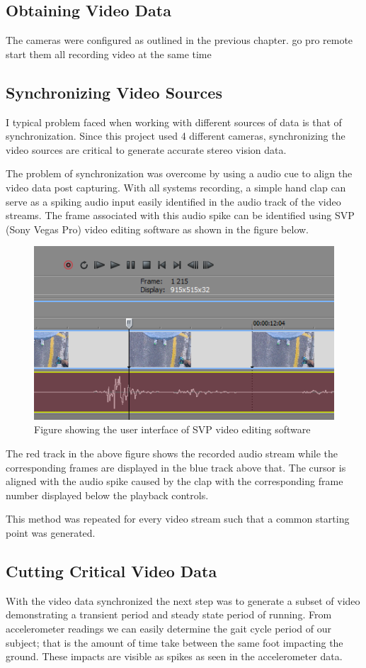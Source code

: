 \subsection{Obtaining Video Data}
The cameras were configured as outlined in the previous chapter. go pro remote start them all recording video at the same time



\subsection{Synchronizing Video Sources}
I typical problem faced when working with different sources of data is that of synchronization. Since this project used 4 different cameras, synchronizing the video sources are critical to generate accurate stereo vision data.

The problem of synchronization was overcome by using a audio cue to align the video data post capturing. With all systems recording, a simple hand clap can serve as a spiking audio input easily identified in the audio track of the video streams. The frame associated with this audio spike can be identified using SVP (Sony Vegas Pro) video editing software as shown in the figure below. 

\begin{figure}[!ht]
\captionsetup{width=0.8\linewidth, font=small} 
\includegraphics[width=0.5\linewidth]{figures/svpframe.png}
\caption{Figure showing the user interface of SVP video editing software}
\label{fig:svpframe}
\end{figure}

The red track in the above figure shows the recorded audio stream while the corresponding frames are displayed in the blue track above that. The cursor is aligned with the audio spike caused by the clap with the corresponding frame number displayed below the playback controls.

This method was repeated for every video stream such that a common starting point was generated. 

\subsection{Cutting Critical Video Data}
With the video data synchronized the next step was to generate a subset of video demonstrating a transient period and steady state period of running. From accelerometer readings we can easily determine the gait cycle period of our subject; that is the amount of time take between the same foot impacting the ground. These impacts are visible as spikes as seen in the accelerometer data.  

